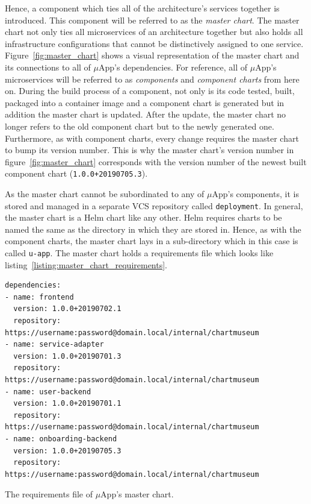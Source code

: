 Hence, a component which ties all of the architecture's services together is
introduced. This component will be referred to as the \textit{master chart}.
The master chart not only ties all microservices of an architecture together
but also holds all infrastructure configurations that cannot be distinctively
assigned to one service. Figure~\ref{fig:master_chart} shows a visual
representation of the master chart and its connections to all of $\mu$App's
dependencies. For reference, all of $\mu$App's microservices will be referred
to as \textit{components} and \textit{component charts} from here on. During
the build process of a component, not only is its code tested, built, packaged
into a container image and a component chart is generated but in addition the
master chart is updated. After the update, the master chart no longer refers to
the old component chart but to the newly generated one. Furthermore, as with
component charts, every change requires the master chart to bump its version
number. This is why the master chart's version number in
figure~\ref{fig:master_chart} corresponds with the version number of the newest
built component chart (\texttt{1.0.0+20190705.3}).

As the master chart cannot be subordinated to any of $\mu$App's components, it
is stored and managed in a separate \ac{VCS} repository called
\texttt{deployment}. In general, the master chart is a Helm chart like any
other. Helm requires charts to be named the same as the directory in which they
are stored in. Hence, as with the component charts, the master chart lays in a
sub-directory which in this case is called \texttt{u-app}. The master chart
holds a requirements file which looks like
listing~\ref{listing:master_chart_requirements}.

\begin{listing}[H]
  \begin{verbatim}
dependencies:
- name: frontend
  version: 1.0.0+20190702.1
  repository: https://username:password@domain.local/internal/chartmuseum
- name: service-adapter
  version: 1.0.0+20190701.3
  repository: https://username:password@domain.local/internal/chartmuseum
- name: user-backend
  version: 1.0.0+20190701.1
  repository: https://username:password@domain.local/internal/chartmuseum
- name: onboarding-backend
  version: 1.0.0+20190705.3
  repository: https://username:password@domain.local/internal/chartmuseum

  \end{verbatim}
  \caption{The requirements file of $\mu$App's master chart.}%
  \label{listing:master_chart_requirements}
\end{listing}

